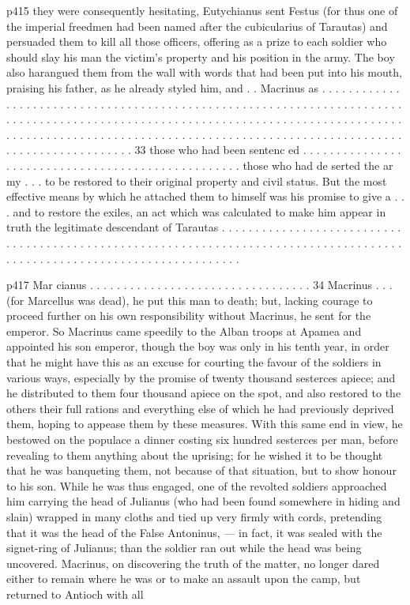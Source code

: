 p415 they were consequently hesitating, Eutychianus sent Festus (for thus one of the imperial freedmen had been named after the cubicularius of Tarautas) and persuaded them to kill all those officers, offering as a prize to each soldier who should slay his man the victim's property and his position in the army. The boy also harangued them from the wall with words that had been put into his mouth, praising his father, as he already styled him, and . . Macrinus as . . . . . . . . . . . . . . . . . . . . . . . . . . . . . . . . . . . . . . . . . . . . . . . . . . . . . . . . . . . . . . . . . . . . . . . . . . . . . . . . . . . . . . . . . . . . . . . . . . . . . . . . . . . . . . . . . . . . . . . . . . . . . . . . . . . . . . . . . . . . . . . . . . . . . . . . . . . . . . . . . . . . . . . . . . . . . . . . . . . . . . . . . . . . . . . . . . . . . . . . . . . . . . . . 33
those who had been sentenc ed . . . . . . . . . . . . . . . . . . . . . . . . . . . . . . . . . . . . . . . . . . . . . . . . . . those who had de serted the ar my . . . to be restored to their original property and civil status. But the most effective means by which he attached them to himself was his promise to give a . . . and to restore the exiles, an act which was calculated to make him appear in truth the legitimate descendant of Tarautas . . . . . . . . . . . . . . . . . . . . . . . . . . . . . . . . . . . . . . . . . . . . . . . . . . . . . . . . . . . . . . . . . . . . . . . . . . . . . . . . . . . . . . . . . . . . . . . . . . . . . . . . . . . . . . . . . . . . . . . . .

p417 Mar cianus . . . . . . . . . . . . . . . . . . . . . . . . . . . . . . . . . 34
Macrinus . . . (for Marcellus was dead), he put this man to death; but, lacking courage to proceed further on his own responsibility without Macrinus, he sent for the emperor. So Macrinus came speedily to the Alban troops at Apamea and appointed his son emperor, though the boy was only in his tenth year, in order that he might have this as an excuse for courting the favour of the soldiers in various ways, especially by the promise of twenty thousand sesterces apiece; and he distributed to them four thousand apiece on the spot, and also restored to the others their full rations and everything else of which he had previously deprived them, hoping to appease them by these measures. With this same end in view, he bestowed on the populace a dinner costing six hundred sesterces per man, before revealing to them anything about the uprising; for he wished it to be thought that he was banqueting them, not because of that situation, but to show honour to his son. While he was thus engaged, one of the revolted soldiers approached him carrying the head of Julianus (who had been found somewhere in hiding and slain) wrapped in many cloths and tied up very firmly with cords, pretending that it was the head of the False Antoninus, \texthebrew{—} in fact, it was sealed with the signet-ring of Julianus; than the soldier ran out while the head was being uncovered. Macrinus, on discovering the truth of the matter, no longer dared either to remain where he was or to make an assault upon the camp, but returned to Antioch with all

